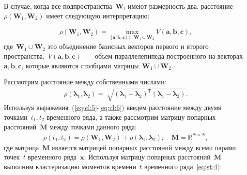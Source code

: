 \documentclass[12pt, twoside]{article}
\numberwithin{equation}{section}
\begin{document}
В случае, когда все подпространства~$\textbf{W}_t$ имеют размерность два, расстояние~$\rho\left(\textbf{W}_1, \textbf{W}_2\right)$ имеет следующую интерпретацию:

\begin{equation}
\label{eq:cl:5}
\begin{aligned}
\rho\left(\textbf{W}_1, \textbf{W}_2\right) = \max_{\{\textbf{a},\textbf{b},\textbf{c}\} \subset \textbf{W}_1\cup \textbf{W}_2 } V\left(\textbf{a},\textbf{b},\textbf{c}\right), 
\end{aligned}
\end{equation}
где~$\textbf{W}_1\cup\textbf{W}_2$ это объединение базисных векторов первого и второго пространства,~$V\left(\textbf{a},\textbf{b},\textbf{c}\right)$~---~объем параллелепипеда построенного на векторах~$\textbf{a}, \textbf{b}, \textbf{c}$, которые являются столбцами матрицы~$\textbf{W}_1\cup\textbf{W}_2$.


Рассмотрим расстояние между собственными числами:
\begin{equation}
\label{eq:cl:6}
\begin{aligned}
\rho\left(\bm{\lambda}_1, \bm{\lambda}_2\right) = \sqrt[]{\left(\bm{\lambda}_1 - \bm{\lambda}_2\right)^{\mathsf{T}}\left(\bm{\lambda}_1 - \bm{\lambda}_2\right)}.
\end{aligned}
\end{equation}
Используя выражения~(\ref{eq:cl:5}-\ref{eq:cl:6}) введем расстояние между двумя точками~$t_1, t_2$ временного ряда, а также рассмотрим матрицу попарных расстояний~$\textbf{M}$ между точками данного ряда:
\begin{equation}
\label{eq:cl:9}
\begin{aligned}
\rho\left(t_1, t_2\right) = \rho\left(\textbf{W}_1, \textbf{W}_2\right) + \rho\left(\bm{\lambda}_1, \bm{\lambda}_2\right), \quad \textbf{M} =  \mathbb{R}^{N\times N},
\end{aligned}
\end{equation}
где %
матрица~$\textbf{M}$ является матрицей попарных расстояний между всеми парами точек~$t$ временного ряда~$\textbf{x}$.
Используя матрицу попарных расстояний~$\textbf{M}$ выполним кластеризацию моментов времени~$t$ временного ряда~\eqref{eq:st:4}:
\end{document}
